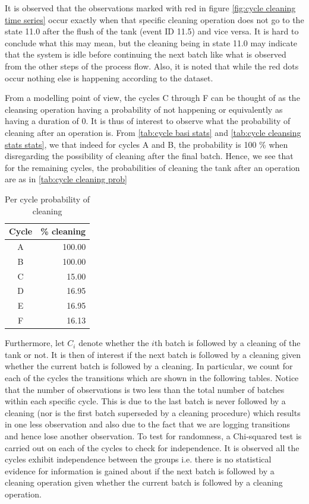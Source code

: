 \documentclass[../Thesis.tex]{subfiles}
\begin{document}
It is observed that the observations marked with red in figure \ref{fig:cycle cleaning time series} occur exactly when that specific cleaning operation does not go to the state 11.0 after the flush of the tank (event ID 11.5) and vice versa. It is hard to conclude what this may mean, but the cleaning being in state 11.0 may indicate that the system is idle before continuing the next batch like what is observed from the other steps of the process flow. Also, it is noted that while the red dots occur nothing else is happening according to the dataset.


From a modelling point of view, the cycles C through F can be thought of as the cleansing operation having a probability of not happening or equivalently as having a duration of 0. It is thus of interest to observe what the probability of cleaning after an operation is. From \autoref{tab:cycle basi stats} and \autoref{tab:cycle cleansing stats stats}, we that indeed for cycles A and B, the probability is 100 \% when disregarding the possibility of cleaning after the final batch. Hence, we see that for the remaining cycles, the probabilities of cleaning the tank after an operation are as in \autoref {tab:cycle cleaning prob}

\begin{table}[h]
    \centering
    \begin{tabular}{c|r}
        Cycle & \% cleaning \\ \hline
        A     & 100.00      \\
        B     & 100.00      \\
        C     & 15.00       \\
        D     & 16.95       \\
        E     & 16.95       \\
        F     & 16.13
    \end{tabular}
    \caption{Per cycle probability of cleaning}
    \label{tab:cycle cleaning prob}
\end{table}


Furthermore, let $C_i$ denote whether the $i$th batch is followed by a cleaning of the tank or not. It is then of interest if the next batch is followed by a cleaning given whether the current batch is followed by a cleaning. In particular, we count for each of the cycles the transitions which are shown in the following tables. Notice that the number of observations is two less than the total number of batches within each specific cycle. This is due to the last batch is never followed by a cleaning (nor is the first batch superseded by a cleaning procedure) which results in one less observation and also due to the fact that we are logging transitions and hence lose another observation. To test for randomness, a Chi-squared test is carried out on each of the cycles to check for independence. It is observed all the cycles exhibit independence between the groups i.e. there is no statistical evidence for information is gained about if the next batch is followed by a cleaning operation given whether the current batch is followed by a cleaning operation.
\end{document}
